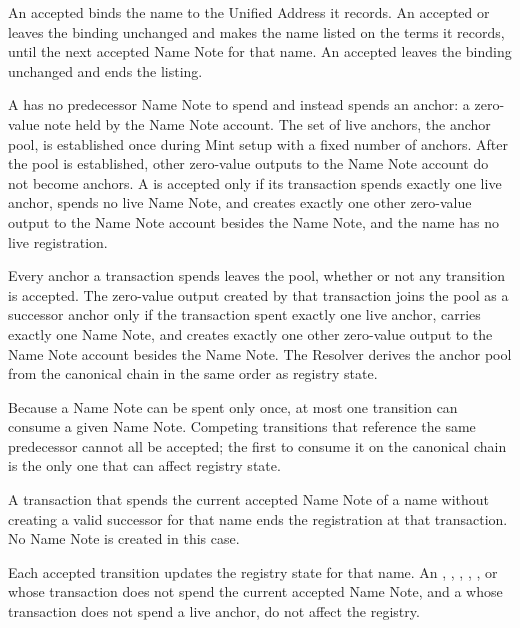 An accepted  binds the name to the Unified Address it records. An accepted  or  leaves the binding unchanged and makes the name listed on the terms it records, until the next accepted Name Note for that name. An accepted  leaves the binding unchanged and ends the listing.

A  has no predecessor Name Note to spend and instead spends an anchor: a zero-value note held by the Name Note account. The set of live anchors, the anchor pool, is established once during Mint setup with a fixed number of anchors. After the pool is established, other zero-value outputs to the Name Note account do not become anchors. A  is accepted only if its transaction spends exactly one live anchor, spends no live Name Note, and creates exactly one other zero-value output to the Name Note account besides the Name Note, and the name has no live registration.

Every anchor a transaction spends leaves the pool, whether or not any transition is accepted. The zero-value output created by that transaction joins the pool as a successor anchor only if the transaction spent exactly one live anchor, carries exactly one Name Note, and creates exactly one other zero-value output to the Name Note account besides the Name Note. The Resolver derives the anchor pool from the canonical chain in the same order as registry state.

Because a Name Note can be spent only once, at most one transition can consume a given Name Note. Competing transitions that reference the same predecessor cannot all be accepted; the first to consume it on the canonical chain is the only one that can affect registry state.

A transaction that spends the current accepted Name Note of a name without creating a valid successor for that name ends the registration at that transaction. No  Name Note is created in this case.

Each accepted transition updates the registry state for that name. An , , , , , or  whose transaction does not spend the current accepted Name Note, and a  whose transaction does not spend a live anchor, do not affect the registry.
